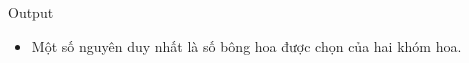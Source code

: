 Output  
\begin{itemize}
	\item     Một số nguyên duy nhất là số bông hoa được chọn của hai khóm hoa.   
\end{itemize}